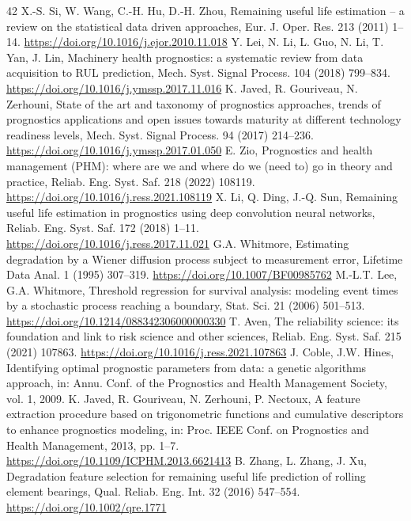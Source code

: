 \begin{thebibliography}{42}
 X.-S. Si, W. Wang, C.-H. Hu, D.-H. Zhou, Remaining useful life estimation -- a review on the statistical data driven approaches, Eur. J. Oper. Res. 213 (2011) 1--14. \url{https://doi.org/10.1016/j.ejor.2010.11.018}
 Y. Lei, N. Li, L. Guo, N. Li, T. Yan, J. Lin, Machinery health prognostics: a systematic review from data acquisition to RUL prediction, Mech. Syst. Signal Process. 104 (2018) 799--834. \url{https://doi.org/10.1016/j.ymssp.2017.11.016}
 K. Javed, R. Gouriveau, N. Zerhouni, State of the art and taxonomy of prognostics approaches, trends of prognostics applications and open issues towards maturity at different technology readiness levels, Mech. Syst. Signal Process. 94 (2017) 214--236. \url{https://doi.org/10.1016/j.ymssp.2017.01.050}
 E. Zio, Prognostics and health management (PHM): where are we and where do we (need to) go in theory and practice, Reliab. Eng. Syst. Saf. 218 (2022) 108119. \url{https://doi.org/10.1016/j.ress.2021.108119}
 X. Li, Q. Ding, J.-Q. Sun, Remaining useful life estimation in prognostics using deep convolution neural networks, Reliab. Eng. Syst. Saf. 172 (2018) 1--11. \url{https://doi.org/10.1016/j.ress.2017.11.021}
 G.A. Whitmore, Estimating degradation by a Wiener diffusion process subject to measurement error, Lifetime Data Anal. 1 (1995) 307--319. \url{https://doi.org/10.1007/BF00985762}
 M.-L.T. Lee, G.A. Whitmore, Threshold regression for survival analysis: modeling event times by a stochastic process reaching a boundary, Stat. Sci. 21 (2006) 501--513. \url{https://doi.org/10.1214/088342306000000330}
 T. Aven, The reliability science: its foundation and link to risk science and other sciences, Reliab. Eng. Syst. Saf. 215 (2021) 107863. \url{https://doi.org/10.1016/j.ress.2021.107863}
 J. Coble, J.W. Hines, Identifying optimal prognostic parameters from data: a genetic algorithms approach, in: Annu. Conf. of the Prognostics and Health Management Society, vol. 1, 2009.
 K. Javed, R. Gouriveau, N. Zerhouni, P. Nectoux, A feature extraction procedure based on trigonometric functions and cumulative descriptors to enhance prognostics modeling, in: Proc. IEEE Conf. on Prognostics and Health Management, 2013, pp. 1--7. \url{https://doi.org/10.1109/ICPHM.2013.6621413}
 B. Zhang, L. Zhang, J. Xu, Degradation feature selection for remaining useful life prediction of rolling element bearings, Qual. Reliab. Eng. Int. 32 (2016) 547--554. \url{https://doi.org/10.1002/qre.1771}

\end{thebibliography}
